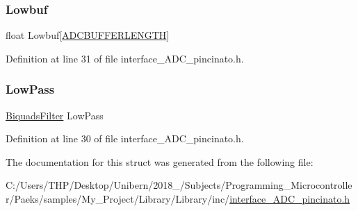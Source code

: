 \subsubsection{\texorpdfstring{Lowbuf}{Lowbuf}}
{\footnotesize\ttfamily float Lowbuf\mbox{[}\mbox{\hyperlink{interface___a_d_c__pincinato_8h_a2ddc9b0b00b7c686d5208fc298aeadb2}{A\+D\+C\+B\+U\+F\+F\+E\+R\+L\+E\+N\+G\+TH}}\mbox{]}}



Definition at line 31 of file interface\+\_\+\+A\+D\+C\+\_\+pincinato.\+h.

\mbox{\label{struct_process_data_____aed3be52a787eac3e0d0981dd8c2bb8a0}} 
\subsubsection{\texorpdfstring{Low\+Pass}{LowPass}}
{\footnotesize\ttfamily \mbox{\hyperlink{filter__math__pincinato_8h_a431282902bc1cfeb168d1acf574331bb}{Biquads\+Filter}} Low\+Pass}



Definition at line 30 of file interface\+\_\+\+A\+D\+C\+\_\+pincinato.\+h.



The documentation for this struct was generated from the following file\+:\begin{DoxyCompactItemize}
\item 
C\+:/\+Users/\+T\+H\+P/\+Desktop/\+Unibern/2018\+\_/\+Subjects/\+Programming\+\_\+\+Microcontroller/\+Paeks/samples/\+My\+\_\+\+Project/\+Library/\+Library/inc/\mbox{\hyperlink{interface___a_d_c__pincinato_8h}{interface\+\_\+\+A\+D\+C\+\_\+pincinato.\+h}}\end{DoxyCompactItemize}
